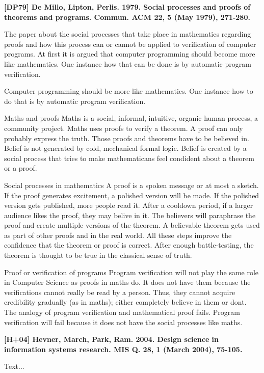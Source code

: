 \documentclass[a4paper,12pt,english]{scrartcl}
\begin{document}
\pagestyle{fancy} %

\noindent
\textbf{\textsf{{\large [DP79] De Millo, Lipton, Perlis. 1979. Social processes and proofs of theorems and programs. Commun. ACM 22, 5 (May 1979), 271-280.}}}
\vspace{2mm}

The paper about the social processes that take place in mathematics regarding
proofs and how this process can or cannot be applied to verification of computer
programs. At first it is argued that computer programming should become more
like mathematics. One instance how that can be done is by automatic program
verification.

Computer programming should be more like mathematics.
	One instance how to do that is by automatic program verification.

Maths and proofs
	Maths is a social, informal, intuitive, organic human process, a community project.
	Maths uses proofs to verify a theorem.
	A proof can only probably express the truth.
	Those proofs and theorems have to be believed in.
	Belief is not generated by cold, mechanical formal logic.
	Belief is created by a social process that tries to make mathematicans feel condident about a theorem
	or a proof.

Social processes in mathematics
	A proof is a spoken message or at most a sketch.
	If the proof generates excitement, a polished version will be made.
	If the polished version gets published, more people read it.
	After a cooldown period, if a larger audience likes the proof, they may belive in it.
	The believers will paraphrase the proof and create multiple versions of the theorem.
	A believable theorem gets used as part of other proofs and in the real world.
	All these steps improve the confidence that the theorem or proof is correct.
	After enough battle-testing, the theorem is thought to be true in the classical sense of truth.

Proof or verification of programs
	Program verification will not play the same role in Computer Science as proofs in maths do.
	It does not have them because the verifications cannot really be read by a person.
	Thus, they cannot acquire credibility gradually (as in maths); either completely believe in them or dont.
	The analogy of program verification and mathematical proof fails.
	Program verification will fail because it does not have the social processes like maths.

\vspace{8mm}

\noindent
\textbf{\textsf{{\large [H+04] Hevner, March, Park, Ram. 2004. Design science in information systems research. MIS Q. 28, 1 (March 2004), 75-105.}}}
\vspace{2mm}

Text...
\end{document}
